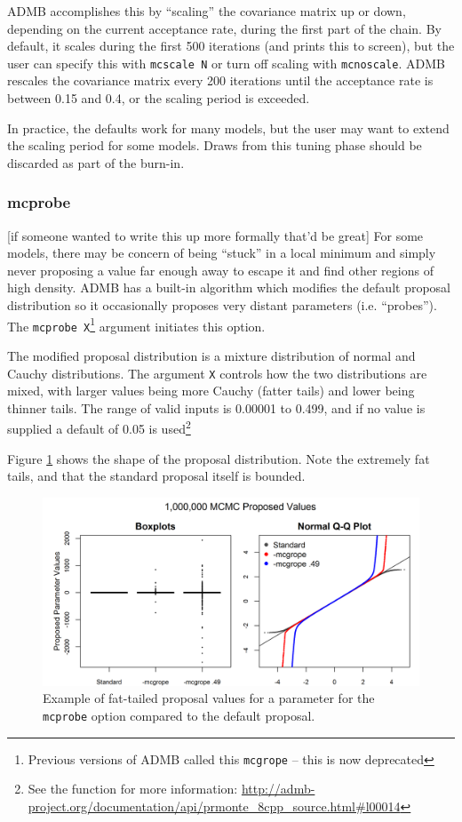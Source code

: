 \documentclass{article}\usepackage[]{graphicx}\usepackage[]{color}
\begin{document}
ADMB accomplishes this by ``scaling'' the covariance matrix
up or down, depending on the current acceptance rate, during
the first part of the chain. By default, it scales during
the first 500 iterations (and prints this to screen), but
the user can specify this with \texttt{mcscale N} or turn
off scaling with \texttt{mcnoscale}. ADMB rescales the
covariance matrix every 200 iterations until the acceptance
rate is between 0.15 and 0.4, or the scaling period is
exceeded.

In practice, the defaults work for many models, but the user
may want to extend the scaling period for some models. Draws
from this tuning phase should be discarded as part of the
burn-in.
\subsubsection{mcprobe}\label{sec:mcprobe}
\large{[if someone wanted to write this up more formally
  that'd be great]}
For some models, there may be concern of being ``stuck'' in
a local minimum and simply never proposing a value far
enough away to escape it and find other regions of high
density. ADMB has a built-in algorithm which modifies the
default proposal distribution so it occasionally proposes
very distant parameters (i.e. ``probes''). The
\texttt{mcprobe X}\footnote{Previous versions of ADMB called
  this \texttt{mcgrope} -- this is now deprecated} argument
initiates this option.

The modified proposal distribution is a mixture distribution
of normal and Cauchy distributions. The argument \texttt{X}
controls how the two distributions are mixed, with larger
values being more Cauchy (fatter tails) and lower being
thinner tails. The range of valid inputs is 0.00001 to
0.499, and if no value is supplied a default of 0.05 is
used\footnote{See the function for more information:
  \url{http://admb-project.org/documentation/api/prmonte\_8cpp\_source.html\#l00014}}


Figure \ref{fig:mcgrope_example} shows the shape of the
proposal distribution. Note the extremely fat tails, and
that the standard proposal itself is bounded.

\begin{figure}[h]
  \centering
  \includegraphics[width=5in]{../plots/mcgrope_example.png}
  \caption{Example of fat-tailed proposal values for a
    parameter for the \texttt{mcprobe} option compared to
    the default proposal.}
  \label{fig:mcgrope_example}
\end{figure}
\end{document}
